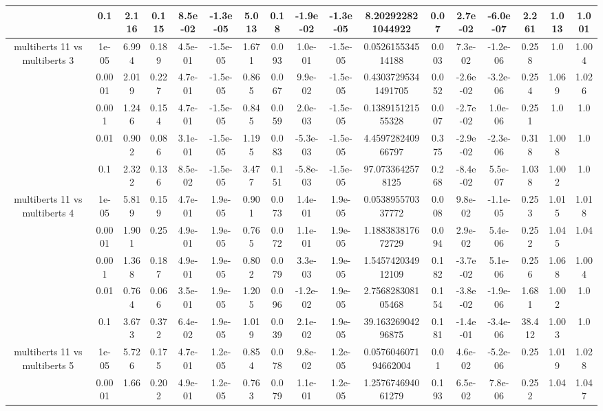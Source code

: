 \begin{tabular}{|c|c|c|c|c|c|c|c|c|c|c|c|c|c|c|c|c|}
 & 0.1 & 2.116 & 0.115 & 8.5e-02 & -1.3e-05 & 5.013 & 0.18 & -1.9e-02 & -1.3e-05 & 8.202922821044922 & 0.07 & 2.7e-02 & -6.0e-07 & 2.261 & 1.013 & 1.001 \\
\hline
\multirow{5}{*}{multiberts 11 vs multiberts 3} & 1e-05 & 6.994 & 0.189 & 4.5e-01 & -1.5e-05 & 1.671 & 0.093 & 1.0e-01 & -1.5e-05 & 0.052615534514188 & 0.003 & 7.3e-02 & -1.2e-06 & 0.258 & 1.0 & 1.004 \\
 & 0.0001 & 2.019 & 0.227 & 4.7e-01 & -1.5e-05 & 0.865 & 0.067 & 9.9e-02 & -1.5e-05 & 0.43037295341491705 & 0.052 & -2.6e-02 & -3.2e-06 & 0.254 & 1.069 & 1.026 \\
 & 0.001 & 1.246 & 0.154 & 4.7e-01 & -1.5e-05 & 0.845 & 0.059 & 2.0e-03 & -1.5e-05 & 0.138915121555328 & 0.007 & -2.7e-02 & 1.0e-06 & 0.251 & 1.0 & 1.0 \\
 & 0.01 & 0.902 & 0.086 & 3.1e-01 & -1.5e-05 & 1.195 & 0.083 & -5.3e-03 & -1.5e-05 & 4.459728240966797 & 0.375 & -2.9e-02 & -2.3e-06 & 0.318 & 1.008 & 1.0 \\
 & 0.1 & 2.322 & 0.136 & 8.5e-02 & -1.5e-05 & 3.477 & 0.151 & -5.8e-03 & -1.5e-05 & 97.0733642578125 & 0.268 & -8.4e-02 & 5.5e-07 & 1.038 & 1.002 & 1.0 \\
\hline
\multirow{5}{*}{multiberts 11 vs multiberts 4} & 1e-05 & 5.819 & 0.159 & 4.7e-01 & 1.9e-05 & 0.901 & 0.073 & 1.4e-01 & 1.9e-05 & 0.053895570337772 & 0.008 & 9.8e-02 & -1.1e-05 & 0.253 & 1.015 & 1.018 \\
 & 0.0001 & 1.901 & 0.25 & 4.9e-01 & 1.9e-05 & 0.765 & 0.072 & 1.1e-01 & 1.9e-05 & 1.188383817672729 & 0.094 & 2.9e-02 & 5.4e-06 & 0.252 & 1.045 & 1.04 \\
 & 0.001 & 1.368 & 0.187 & 4.9e-01 & 1.9e-05 & 0.802 & 0.079 & 3.3e-03 & 1.9e-05 & 1.545742034912109 & 0.182 & -3.7e-02 & 5.1e-06 & 0.256 & 1.068 & 1.004 \\
 & 0.01 & 0.764 & 0.066 & 3.5e-01 & 1.9e-05 & 1.205 & 0.096 & -1.2e-02 & 1.9e-05 & 2.756828308105468 & 0.154 & -3.8e-02 & -1.9e-06 & 1.681 & 1.002 & 1.0 \\
 & 0.1 & 3.673 & 0.372 & 6.4e-02 & 1.9e-05 & 1.019 & 0.039 & 2.1e-02 & 1.9e-05 & 39.16326904296875 & 0.181 & -1.4e-01 & -3.4e-06 & 38.412 & 1.003 & 1.0 \\
\hline
\multirow{5}{*}{multiberts 11 vs multiberts 5} & 1e-05 & 5.726 & 0.175 & 4.7e-01 & 1.2e-05 & 0.854 & 0.078 & 9.8e-02 & 1.2e-05 & 0.057604607194662004 & 0.01 & 4.6e-02 & -5.2e-06 & 0.25 & 1.019 & 1.028 \\
 & 0.0001 & 1.66 & 0.202 & 4.9e-01 & 1.2e-05 & 0.763 & 0.079 & 1.1e-01 & 1.2e-05 & 1.257674694061279 & 0.193 & 6.5e-02 & 7.8e-06 & 0.252 & 1.04 & 1.047 \\

\end{tabular}
